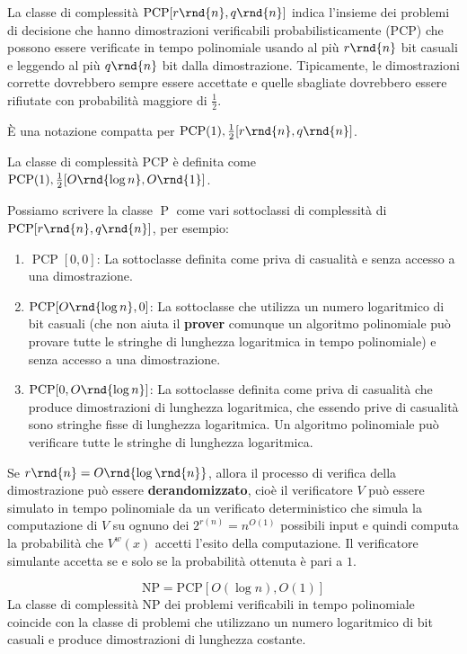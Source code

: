 \documentclass[\main/main.tex]{subfiles}
\begin{document}
\begin{definition}
    La classe di complessità \(\operatorname{PCP}[r\rnd{n}, q\rnd{n}]\) indica l'insieme dei problemi di decisione che hanno dimostrazioni verificabili probabilisticamente (PCP) che possono essere verificate in tempo polinomiale usando al più \(r\rnd{n}\) bit casuali e leggendo al più \(q\rnd{n}\) bit dalla dimostrazione. Tipicamente, le dimostrazioni corrette dovrebbero sempre essere accettate e quelle sbagliate dovrebbero essere rifiutate con probabilità maggiore di \(\frac{1}{2}\).
    
    È una notazione compatta per \(\operatorname{PCP}(1), \frac{1}{2}[r\rnd{n}, q\rnd{n}]\).
\end{definition}
\begin{definition}
    La classe di complessità PCP è definita come \(\operatorname{PCP}(1), \frac{1}{2}[O\rnd{\log n}, O\rnd{1}]\).
\end{definition}
\begin{observation}
    Possiamo scrivere la classe \(\operatorname{P}\) come vari sottoclassi di complessità di \(\operatorname{PCP}[r\rnd{n}, q\rnd{n}]\), per esempio:
    \begin{enumerate}
        \item \(\operatorname{PCP}[0, 0]\): La sottoclasse definita come priva di casualità e senza accesso a una dimostrazione.
        \item \(\operatorname{PCP}[O\rnd{\log{n}}, 0]\): La sottoclasse che utilizza un numero logaritmico di bit casuali (che non aiuta il \textbf{prover} comunque un algoritmo polinomiale può provare tutte le stringhe di lunghezza logaritmica in tempo polinomiale) e senza accesso a una dimostrazione.
        \item \(\operatorname{PCP}[0, O\rnd{\log{n}}]\): La sottoclasse definita come priva di casualità che produce dimostrazioni di lunghezza logaritmica, che essendo prive di casualità sono stringhe fisse di lunghezza logaritmica. Un algoritmo polinomiale può verificare tutte le stringhe di lunghezza logaritmica.
    \end{enumerate}
\end{observation}
\begin{definition}[Derandomizzazione]
    Se \(r\rnd{n} = O\rnd{\log\rnd{n}}\), allora il processo di verifica della dimostrazione può essere \textbf{derandomizzato}, cioè il verificatore \(V\) può essere simulato in tempo polinomiale da un verificato deterministico che simula la computazione di \(V\) su ognuno dei \(2^{r(n)}=n^{O(1)}\) possibili input e quindi computa la probabilità che \(V^{w}(x)\) accetti l'esito della computazione. Il verificatore simulante accetta se e solo se la probabilità ottenuta è pari a \(1\).
\end{definition}
\begin{theorem}
    \[
        \mathrm{NP}=\mathrm{PCP}[O(\log n), O(1)]
    \]
    La classe di complessità NP dei problemi verificabili in tempo polinomiale coincide con la classe di problemi che utilizzano un numero logaritmico di bit casuali e produce dimostrazioni di lunghezza costante.
\end{theorem}
\end{document}

